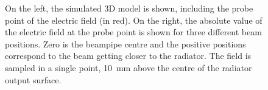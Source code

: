 \begin{figure}[!t]
\centering
{}
\hspace{1mm}
\caption{On the left, the simulated 3D model is shown, including the probe point of the electric field (in red). On the right, the absolute value of the electric field at the probe point is shown for three different beam positions.  Zero is the beampipe centre and the positive positions correspond to the beam getting closer to the radiator. The field is sampled in a single point, 10~mm above the centre of the radiator output surface.}\label{fig:sim_t_scan}
\end{figure}

